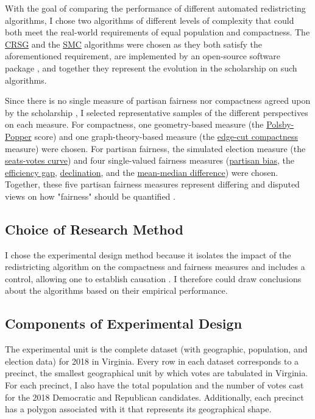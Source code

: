 With the goal of comparing the performance of different automated redistricting algorithms, I chose two algorithms of different levels of complexity that could both meet the real-world requirements of equal population and compactness. The \hyperref[sec:crsg]{CRSG} \parencite{chen2013} and the \hyperref[sec:smc]{SMC} \parencite{mccartan2020} algorithms were chosen as they both satisfy the aforementioned requirement, are implemented by an open-source software package \parencite{fifield2020d}, and together they represent the evolution in the scholarship on such algorithms. 

Since there is no single measure of partisan fairness nor compactness agreed upon by the scholarship \parencite{katz2020}, I selected representative samples of the different perspectives on each measure. For compactness, one geometry-based measure (the \hyperref[sec:polsbypopper]{Polsby-Popper} score) and one graph-theory-based measure (the \hyperref[sec:edgecut]{edge-cut compactness} measure) were chosen. For partisan fairness, the simulated election measure (the \hyperref[sec:seatsvotes]{seats-votes curve}) and four single-valued fairness measures (\hyperref[sec:bias]{partisan bias}, the \hyperref[sec:effgap]{efficiency gap}, \hyperref[sec:declination]{declination}, and the \hyperref[sec:meanmed]{mean-median difference}) were chosen. Together, these five partisan fairness measures represent differing and disputed views on how "fairness" should be quantified \parencite{katz2020}. 

\subsection{Choice of Research Method}

I chose the experimental design method because it isolates the impact of the redistricting algorithm on the compactness and fairness measures and includes a control, allowing one to establish causation \parencite{peirce2014}. I therefore could draw conclusions about the algorithms based on their empirical performance. 

\subsection{Components of Experimental Design}

The experimental unit is the complete dataset (with geographic, population, and election data) for 2018 in Virginia. Every row in each dataset corresponds to a precinct, the smallest geographical unit by which votes are tabulated in Virginia. For each precinct, I also have the total population and the number of votes cast for the 2018 Democratic and Republican candidates. Additionally, each precinct has a polygon associated with it that represents its geographical shape.


